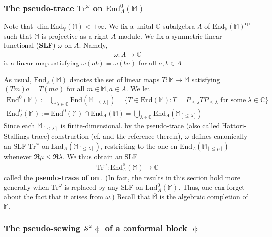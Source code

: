 \documentclass[11pt,b5paper,notitlepage]{article}
\theoremstyle{definition}
\theoremstyle{plain}
\newcommand{\ovl}{\overline}
\newcommand{\Tr}{\mathrm{Tr}}
\newcommand{\End}{\mathrm{End}} %
\newcommand{\Vbb}{\mathbb V}
\newcommand{\Mbb}{\mathbb M}
\newcommand{\Cbb}{\mathbb C}
\newcommand{\<}{\left\langle}
\renewcommand{\>}{\right\rangle}
\newcommand{\MS}{\mathcal{S}}
\numberwithin{equation}{subsection}
\begin{document}
\subsubsection{The pseudo-trace $\Tr^\omega$ on $\End^0_A(\Mbb)$}

Note that $\dim\End_\Vbb(\Mbb)<+\infty$. We fix a unital $\Cbb$-subalgebra $A$ of $\End_\Vbb(\Mbb)^\mathrm{op}$ such that $\Mbb$ is projective as a right $A$-module. We fix a symmetric linear functional (\textbf{SLF}) $\omega$ on $A$. Namely, 
\begin{align*}
\omega:A\rightarrow\Cbb
\end{align*}
is a linear map satisfying $\omega(ab)=\omega(ba)$ for all $a,b\in A$. 

As usual, $\End_A(\Mbb)$ denotes the set of linear maps $T:\Mbb\rightarrow\Mbb$ satisfying $(Tm)a=T(m a)$ for all $m\in\Mbb,a\in A$. We let
\begin{gather*}
\End^0(\Mbb):=\bigcup_{\lambda\in\Cbb} \End(\Mbb_{[\leq\lambda]})=\{T\in\End(\Mbb):T=P_{\leq\lambda}TP_{\leq\lambda}\text{ for some }\lambda\in\Cbb\}\\
\End^0_A(\Mbb):=\End^0(\Mbb)\cap\End_A(\Mbb)=\bigcup_{\lambda\in\Cbb}\End_A(\Mbb_{[\leq\lambda]})
\end{gather*}
Since each $\Mbb_{[\leq\lambda]}$ is finite-dimensional, by the pseudo-trace (also called Hattori-Stallings trace) construction (cf. \cite{Ari10} and the reference therein), $\omega$ defines canonically an SLF $\Tr^\omega$ on $\End_A(\Mbb_{[\leq\lambda]})$, restricting to the one on $\End_A(\Mbb_{[\leq\mu]})$ whenever $\Re\mu\leq\Re\lambda$. We thus obtain an SLF
\begin{align*}
\Tr^\omega:\End_A^0(\Mbb)\rightarrow\Cbb
\end{align*}
called the \textbf{pseudo-trace of \pmb{$\omega$} on \pmb{$\End_A^0(\Mbb)$}}. (In fact, the results in this section hold more generally when $\Tr^\omega$ is replaced by any SLF on $\End_A^0(\Mbb)$. Thus, one can forget about the fact that it arises from $\omega$.) Recall that $\ovl{\Mbb}$ is the algebraic completion of $\Mbb$.


\subsubsection{The pseudo-sewing $\MS^\omega\upphi$ of a conformal block $\upphi$}
\end{document}
